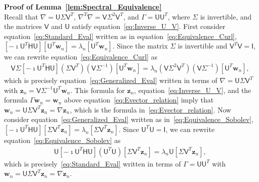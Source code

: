\documentclass[english,12pt,jmp,graphicx]{revtex4-1}
\newcommand{\vecw}{\boldsymbol{w}}
\newcommand{\vecz}{\boldsymbol{z}}
\newcommand{\lemref}[1]{Lemma~\ref{#1}}
\newcommand{\Hm}{\mathsf{H}}
\newcommand{\Um}{\mathsf{U}}
\newcommand{\Vm}{\mathsf{V}}
\newcommand{\Ib}{\mathsf{I}}
\begin{document}
\noindent\textbf{Proof of \lemref{lem:Spectral_Equivalence}}\\
%
Recall that $\nabla=\Um\Sigma\Vm^T$, $\nabla^T\nabla=\Vm\Sigma^2\Vm^T$, and $\Gamma=\Um\Um^T$, where
$\Sigma$ is invertible,  and the matrices $\Vm$ and $\Um$ satisfy
equation~\eqref{eq:Inverse_U_V}. 
First consider equation~\eqref{eq:Standard_Eval} written as in
equation~\eqref{eq:Equivalence_Curl},
$[-\imath\Um^T\Hm\Um][\Um^T\vecw_n]=\lambda_n[\Um^T\vecw_n]$. Since the matrix
$\Sigma$ is invertible and $\Vm^T\Vm=\Ib$, we can rewrite 
equation~\eqref{eq:Equivalence_Curl} as  
%
\begin{align}
  \Vm\Sigma[-\imath\Um^T\Hm\Um](\Sigma\Vm^T)(\Vm\Sigma^{-1})[\Um^T\vecw_n]
     =\lambda_n(\Vm\Sigma^2\Vm^T)(\Vm\Sigma^{-1})[\Um^T\vecw_n],
\end{align}
%
which is precisely equation~\eqref{eq:Generalized_Eval} written in
terms of $\nabla=\Um\Sigma\Vm^T$ with $\vecz_n=\Vm\Sigma^{-1}\Um^T\vecw_n$. This
formula for $\vecz_n$, equation~\eqref{eq:Inverse_U_V}, and the formula
$\Gamma\vecw_n=\vecw_n$ above equation~\eqref{eq:Evector_relation} imply
that $\vecw_n=\Um\Sigma\Vm^T\vecz_n=\nabla\vecz_n$, which is the
formula in~\eqref{eq:Evector_relation}. Now consider 
equation~\eqref{eq:Generalized_Eval} written as
in~\eqref{eq:Equivalence_Sobolev},
$[-\imath\Um^T\Hm\Um][\Sigma\Vm^T\vecz_n]=\lambda_n[\Sigma\Vm^T\vecz_n]$. Since
$\Um^T\Um=\Ib$, we can rewrite equation~\eqref{eq:Equivalence_Sobolev}
as   
%
\begin{align}
  \Um[-\imath\Um^T\Hm\Um](\Um^T\Um)[\Sigma\Vm^T\vecz_n]=\lambda_n\Um[\Sigma\Vm^T\vecz_n],
\end{align}
%
which is precisely~\eqref{eq:Standard_Eval} written in
terms of $\Gamma=\Um\Um^T$ with $\vecw_n=\Um\Sigma\Vm^T\vecz_n=\nabla\vecz_n$. 
\end{document}
